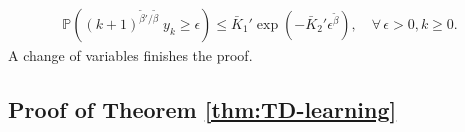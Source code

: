 \documentclass[letterpaper, 10 pt]{article}
\begin{document}
\begin{align*}
    \mathbb{P}\left((k+ 1)^{{\tilde{\beta}}'/{\tilde{\beta}}}\;y_k\geq \epsilon\right)\leq \bar{K}_1'\exp\left(-\bar{K}_2'\epsilon^{\tilde{\beta}}\right),\quad \forall\,\epsilon>0,k\geq 0.
\end{align*}
A change of variables finishes the proof.
























\subsection{Proof of Theorem \ref{thm:TD-learning}} \label{proof:TD-learning}
\end{document}
